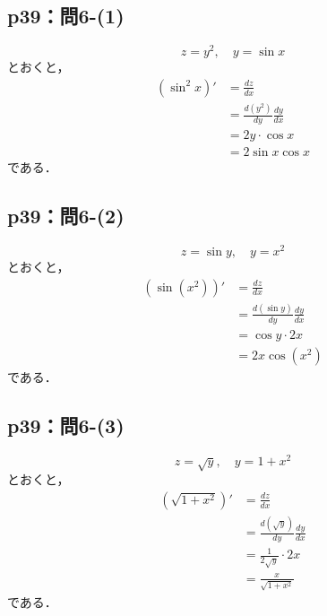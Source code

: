 \documentclass[uplatex,dvipdfmx,a4paper,10pt,fleqn]{jsarticle}
\newenvironment{tleftbar}{\begin{tbleftline}\setlength{\parindent}{1zw}}{\end{tbleftline}}
\begin{document}
\subsection*{p39：問6-(1)}

\begin{tleftbar}
    \[
        z = y^2 , \quad y = \sin x
    \]
    とおくと，
    \begin{align*} 
        (\sin ^2 x) '  &= \frac{dz}{dx} \\
        & = \frac{d (y^2)}{dy} \frac{dy}{dx}\\
        &= 2y \cdot \cos x \\
        & = 2 \sin x \cos x 
    \end{align*}
    である．
\end{tleftbar}


\subsection*{p39：問6-(2)}


\begin{tleftbar}
    \[
        z = \sin y , \quad y = x^2
    \]
    とおくと，
    \begin{align*} 
        (\sin (x^2)) '  &= \frac{dz}{dx} \\
        & = \frac{d (\sin y)}{dy} \frac{dy}{dx}\\
        &= \cos y \cdot 2x \\
        & = 2x \cos (x^2)
    \end{align*}
    である．
\end{tleftbar}


\subsection*{p39：問6-(3)}


\begin{tleftbar}
    \[
        z = \sqrt{y} , \quad y = 1+x^2
    \]
    とおくと，
    \begin{align*} 
        (\sqrt{1+x^2}) '  &= \frac{dz}{dx} \\
        & = \frac{d (\sqrt{y})}{dy} \frac{dy}{dx}\\
        &= \frac{1}{2\sqrt{y}}\cdot 2x \\
        & = \frac{x}{\sqrt{1+x^2}}
    \end{align*}
    である．
\end{tleftbar}
\end{document}
